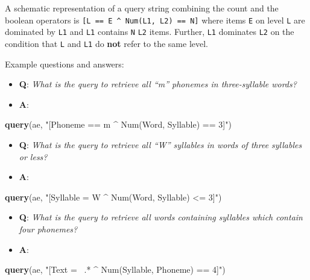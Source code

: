 \documentclass[]{book}
\newenvironment{Shaded}{\begin{snugshade}}{\end{snugshade}}
\newcommand{\KeywordTok}[1]{\textcolor[rgb]{0.13,0.29,0.53}{\textbf{#1}}}
\newcommand{\NormalTok}[1]{#1}
\newcommand{\StringTok}[1]{\textcolor[rgb]{0.31,0.60,0.02}{#1}}
\providecommand{\tightlist}{%
  \setlength{\itemsep}{0pt}\setlength{\parskip}{0pt}}
\begin{document}
A schematic representation of a query string combining the count and the boolean operators is \texttt{{[}L\ ==\ E\ \^{}\ Num(L1,\ L2)\ ==\ N{]}} where items \texttt{E} on level \texttt{L} are dominated by \texttt{L1} and \texttt{L1} contains \texttt{N} \texttt{L2} items. Further, \texttt{L1} dominates \texttt{L2} on the condition that \texttt{L} and \texttt{L1} do \textbf{not} refer to the same level.

Example questions and answers:

\begin{itemize}
\tightlist
\item
  \textbf{Q}: \emph{What is the query to retrieve all ``m'' phonemes in three-syllable words?}
\item
  \textbf{A}:
\end{itemize}

\begin{Shaded}
\begin{Highlighting}[]
\KeywordTok{query}\NormalTok{(ae, }\StringTok{"[Phoneme == m ^ Num(Word, Syllable) == 3]"}\NormalTok{)}
\end{Highlighting}
\end{Shaded}

\begin{itemize}
\tightlist
\item
  \textbf{Q}: \emph{What is the query to retrieve all ``W'' syllables in words of three syllables or less?}
\item
  \textbf{A}:
\end{itemize}

\begin{Shaded}
\begin{Highlighting}[]
\KeywordTok{query}\NormalTok{(ae, }\StringTok{"[Syllable = W ^ Num(Word, Syllable) <= 3]"}\NormalTok{)}
\end{Highlighting}
\end{Shaded}

\begin{itemize}
\tightlist
\item
  \textbf{Q}: \emph{What is the query to retrieve all words containing syllables which contain four phonemes?}
\item
  \textbf{A}:
\end{itemize}

\begin{Shaded}
\begin{Highlighting}[]
\KeywordTok{query}\NormalTok{(ae, }\StringTok{"[Text =~ .* ^ Num(Syllable, Phoneme) == 4]"}\NormalTok{)}
\end{Highlighting}
\end{Shaded}
\end{document}
